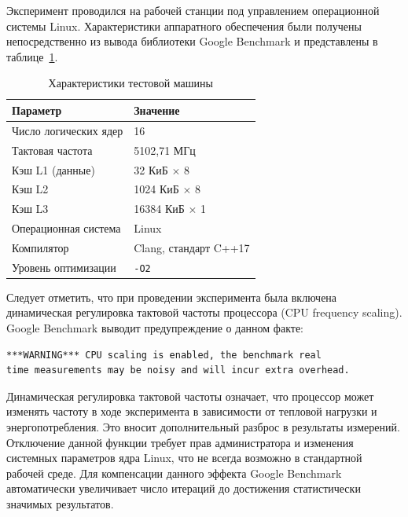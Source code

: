 Эксперимент проводился на рабочей станции под управлением
операционной системы Linux. Характеристики аппаратного
обеспечения были получены непосредственно из вывода библиотеки
Google Benchmark и представлены в таблице~\ref{tab:hardware}.

\begin{table}[h]
\caption{Характеристики тестовой машины}
\label{tab:hardware}
\begin{tabular}{|l|l|}
\hline
\textbf{Параметр} & \textbf{Значение} \\
\hline
Число логических ядер    & 16 \\
\hline
Тактовая частота         & 5102,71 МГц \\
\hline
Кэш L1 (данные)          & 32 КиБ $\times$ 8 \\
\hline
Кэш L2                   & 1024 КиБ $\times$ 8 \\
\hline
Кэш L3                   & 16384 КиБ $\times$ 1 \\
\hline
Операционная система     & Linux \\
\hline
Компилятор               & Clang, стандарт C++17 \\
\hline
Уровень оптимизации      & \texttt{-O2} \\
\hline
\end{tabular}
\end{table}

Следует отметить, что при проведении эксперимента была включена
динамическая регулировка тактовой частоты процессора (CPU
frequency scaling). Google Benchmark выводит предупреждение
о данном факте:

\begin{lstlisting}[caption={Предупреждение Google Benchmark
                            о CPU scaling},
                   label={lst:cpu-scaling}]
***WARNING*** CPU scaling is enabled, the benchmark real
time measurements may be noisy and will incur extra overhead.
\end{lstlisting}

Динамическая регулировка тактовой частоты означает, что процессор
может изменять частоту в ходе эксперимента в зависимости от
тепловой нагрузки и энергопотребления. Это вносит дополнительный
разброс в результаты измерений. Отключение данной функции
требует прав администратора и изменения системных параметров
ядра Linux, что не всегда возможно в стандартной рабочей среде.
Для компенсации данного эффекта Google Benchmark автоматически
увеличивает число итераций до достижения статистически
значимых результатов.

